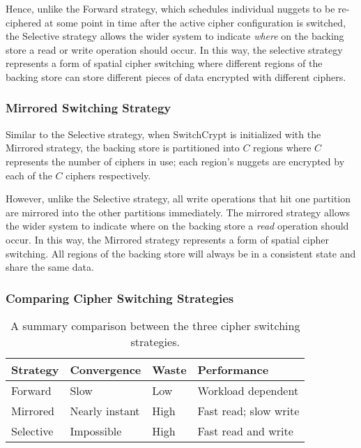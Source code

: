 Hence, unlike the Forward strategy, which schedules individual nuggets to be
re-ciphered at some point in time after the active cipher configuration is
switched, the Selective strategy allows the wider system to indicate
\emph{where} on the backing store a read or write operation should occur. In
this way, the selective strategy represents a form of spatial cipher switching
where different regions of the backing store can store different pieces of data
encrypted with different ciphers.

\subsubsection{Mirrored Switching Strategy}

Similar to the Selective strategy, when SwitchCrypt is initialized with the
Mirrored strategy, the backing store is partitioned into $C$ regions where $C$
represents the number of ciphers in use; each region's nuggets are encrypted by
each of the $C$ ciphers respectively.

However, unlike the Selective strategy, all write operations that hit one
partition are mirrored into the other partitions immediately. The mirrored
strategy allows the wider system to indicate where on the backing store a
\emph{read} operation should occur. In this way, the Mirrored strategy
represents a form of spatial cipher switching. All regions of the backing store
will always be in a consistent state and share the same data.

\subsubsection{Comparing Cipher Switching Strategies}

\begin{table}[]
   \begin{tabular}{@{}|l|l|l|l|@{}}
      \toprule
      \textbf{Strategy} & \textbf{Convergence} & \textbf{Waste} & \textbf{Performance} \\ \midrule
      Forward   & Slow           & Low  & Workload dependent    \\
      \hline
      Mirrored  & Nearly instant & High & Fast read; slow write \\
      \hline
      Selective & Impossible     & High & Fast read and write   \\
      \hline
   \end{tabular}
   \caption{A summary comparison between the three cipher switching strategies.}
   \label{tbl:strategies-advantages}
\end{table}

